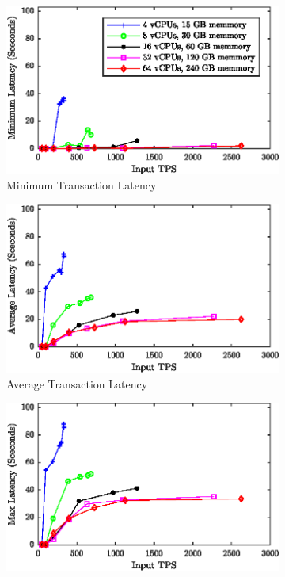 \documentclass[conference]{IEEEtran}
\begin{document}
\begin{figure}
\centering
\begin{subfigure}{0.99\columnwidth}
\includegraphics[width=\columnwidth]{figs/minLoad.eps}%
\caption{Minimum Transaction Latency}%
\label{latency_min}%
\end{subfigure}\hfill%
\begin{subfigure}{0.99\columnwidth}
\includegraphics[width=\columnwidth]{figs/avgLoad.eps}%
\caption{Average Transaction Latency}%
\label{latency_avg}%
\end{subfigure}\hfill%
\vspace{7mm}
\begin{subfigure}{0.99\columnwidth}
\includegraphics[width=\columnwidth]{figs/maxLoad.eps}%

\end{subfigure}
\end{figure}
\end{document}
